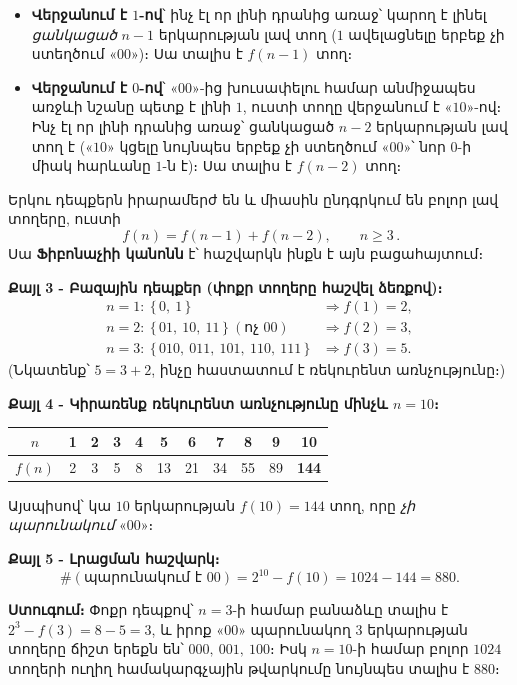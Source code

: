 \documentclass[11pt,a4paper]{article}
\begin{document}
\begin{itemize}[leftmargin=1.4em,itemsep=1pt]
  \item \textbf{Վերջանում է $1$-ով}՝ ինչ էլ որ լինի դրանից առաջ՝ կարող է լինել \emph{ցանկացած}
        $n-1$ երկարության լավ տող ($1$ ավելացնելը երբեք չի ստեղծում «$00$»)։ Սա տալիս է
        $f(n-1)$ տող։
  \item \textbf{Վերջանում է $0$-ով}՝ «$00$»-ից խուսափելու համար անմիջապես առջևի նշանը պետք է
        լինի $1$, ուստի տողը վերջանում է «$10$»-ով։ Ինչ էլ որ լինի դրանից առաջ՝ ցանկացած
        $n-2$ երկարության լավ տող է («$10$» կցելը նույնպես երբեք չի ստեղծում «$00$»՝ նոր $0$-ի միակ
        հարևանը $1$-ն է)։ Սա տալիս է $f(n-2)$ տող։
\end{itemize}
Երկու դեպքերն իրարամերժ են և միասին ընդգրկում են բոլոր լավ տողերը, ուստի
\[
\boxed{\,f(n) = f(n-1) + f(n-2),\qquad n\ge 3\,}.
\]
Սա \textbf{Ֆիբոնաչիի կանոնն} է՝ հաշվարկն ինքն է այն բացահայտում։

\textbf{Քայլ 3 - Բազային դեպքեր (փոքր տողերը հաշվել ձեռքով)։}
\[
\begin{aligned}
n=1:\ \{\,0,\ 1\,\} &\Rightarrow f(1)=2,\\
n=2:\ \{\,01,\ 10,\ 11\,\}\ (\text{ոչ } 00) &\Rightarrow f(2)=3,\\
n=3:\ \{\,010,\ 011,\ 101,\ 110,\ 111\,\} &\Rightarrow f(3)=5.
\end{aligned}
\]
(Նկատենք՝ $5=3+2$, ինչը հաստատում է ռեկուրենտ առնչությունը։)

\textbf{Քայլ 4 - Կիրառենք ռեկուրենտ առնչությունը մինչև $n=10$։}
\begin{center}
\small
\begin{tabular}{@{}c|cccccccccc@{}}
\toprule
$n$    & 1 & 2 & 3 & 4 & 5 & 6 & 7 & 8 & 9 & 10\\
\midrule
$f(n)$ & 2 & 3 & 5 & 8 & 13 & 21 & 34 & 55 & 89 & \textbf{144}\\
\bottomrule
\end{tabular}
\end{center}
Այսպիսով՝ կա $10$ երկարության $f(10)=144$ տող, որը \emph{չի պարունակում} «$00$»։

\textbf{Քայլ 5 - Լրացման հաշվարկ։}
\[
\#(\text{պարունակում է } 00) = 2^{10} - f(10) = 1024 - 144 = 880.
\]

\textbf{Ստուգում։} Փոքր դեպքով՝ $n=3$-ի համար բանաձևը տալիս է $2^3-f(3)=8-5=3$, և իրոք «$00$»
պարունակող $3$ երկարության տողերը ճիշտ երեքն են՝ $000,\ 001,\ 100$։ Իսկ $n=10$-ի համար բոլոր $1024$
տողերի ուղիղ համակարգչային թվարկումը նույնպես տալիս է $880$։ \checkmark
\end{document}
